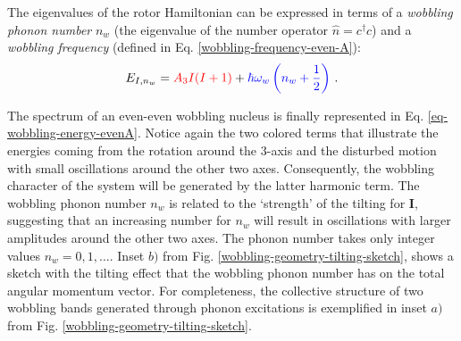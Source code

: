 The eigenvalues of the rotor Hamiltonian can be expressed in terms of a \emph{wobbling phonon number} $n_w$ (the eigenvalue of the number operator $\hat{n}=c^\dagger c$) and a \emph{wobbling frequency} (defined in Eq. \ref{wobbling-frequency-even-A}):
\begin{align}
    E_{I,n_w}={\color{red}A_3I(I+1)}+{\color{blue}\hbar\omega_w\left(n_w+\frac{1}{2}\right)}\ .
    \label{eq-wobbling-energy-evenA}
\end{align}

The spectrum of an even-even wobbling nucleus is finally represented in Eq. \ref{eq-wobbling-energy-evenA}. Notice again the two colored terms that illustrate the energies coming from the rotation around the $3$-axis and the disturbed motion with small oscillations around the other two axes. Consequently, the wobbling character of the system will be generated by the latter harmonic term. The wobbling phonon number $n_w$ is related to the `strength' of the tilting for $\mathbf{I}$, suggesting that an increasing number for $n_w$ will result in oscillations with larger amplitudes around the other two axes. The phonon number takes only integer values $n_w=0,1,\dots$. Inset $b)$ from Fig. \ref{wobbling-geometry-tilting-sketch}, shows a sketch with the tilting effect that the wobbling phonon number has on the total angular momentum vector. For completeness, the collective structure of two wobbling bands generated through phonon excitations is exemplified in inset $a)$ from Fig. \ref{wobbling-geometry-tilting-sketch}.
